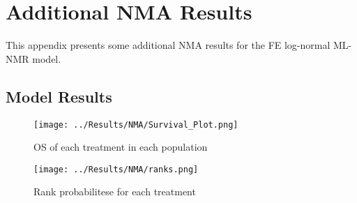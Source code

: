 \chapter{Additional NMA Results}\label{NMAAppendix}

This appendix presents some additional NMA results for the FE log-normal ML-NMR model. 

\section{Model Results}

\begin{figure}[h]
    \centering
    \texttt{[image: ../Results/NMA/Survival\_Plot.png]}
    \caption{OS of each treatment in each population}
    \label{fig:pred_survbc}
\end{figure}

\begin{figure}[h]
    \centering
    \texttt{[image: ../Results/NMA/ranks.png]}
    \caption{Rank probabilitese for each treatment}
    \label{fig:rankplot}
\end{figure}
